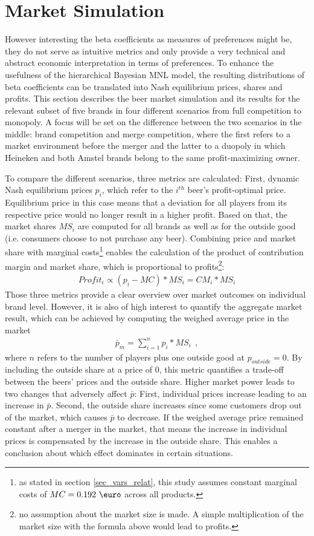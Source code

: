\documentclass[12pt,a4paper]{article}
\begin{document}
\section{Market Simulation} \label{sec_marketsim}

However interesting the beta coefficients as measures of preferences might be, they do not serve as intuitive metrics and only provide a very technical and abstract economic interpretation in terms of preferences.
To enhance the usefulness of the hierarchical Bayesian MNL model, the resulting distributions of beta coefficients can be translated into Nash equilibrium prices, shares and profits.
This section describes the beer market simulation and its results for the relevant subset of five brands in four different scenarios from full competition to monopoly.
A focus will be set on the difference between the two scenarios in the middle: brand competition and merge competition, where the first refers to a market environment before the merger and the latter to a duopoly in which Heineken and both Amstel brands belong to the same profit-maximizing owner.

To compare the different scenarios, three metrics are calculated: First, dynamic Nash equilibrium prices $p_i$, which refer to the $i^{th}$ beer's profit-optimal price.
Equilibrium price in this case means that a deviation for all players from its respective price would no longer result in a higher profit.
Based on that, the market shares $MS_i$ are computed for all brands as well as for the outside good (i.e. consumers choose to not purchase any beer).
Combining price and market share with marginal costs\footnote{as stated in section \ref{sec_vars_relat}, this study assumes constant marginal costs of $MC = 0.192 \text{ \euro}$ across all products.} enables the calculation of the product of contribution margin and market share, which is proportional to profits\footnote{no assumption about the market size is made. A simple multiplication of the market size with the formula above would lead to profits.}:
\begin{align*}
Profit_i \propto (p_i - MC) * MS_i = CM_i * MS_i
\end{align*}
Those three metrics provide a clear overview over market outcomes on individual brand level.
However, it is also of high interest to quantify the aggregate market result, which can be achieved by computing the weighed average price in the market 
\begin{align*}
\bar{p}_m = \sum_{i=1}^n{p_i * MS_i}~~,
\end{align*}
where $n$ refers to the number of players plus one outside good at $p_{outside} = 0$.
By including the outside share at a price of 0, this metric quantifies a trade-off between the beers' prices and the outside share.
Higher market power leads to two changes that adversely affect $\bar{p}$: First, individual prices increase leading to an increase in $\bar{p}$.
Second, the outside share increases since some customers drop out of the market, which causes $\bar{p}$ to decrease.
If the weighed average price remained constant after a merger in the market, that means the increase in individual prices is compensated by the increase in the outside share.
This enables a conclusion about which effect dominates in certain situations.
\end{document}
